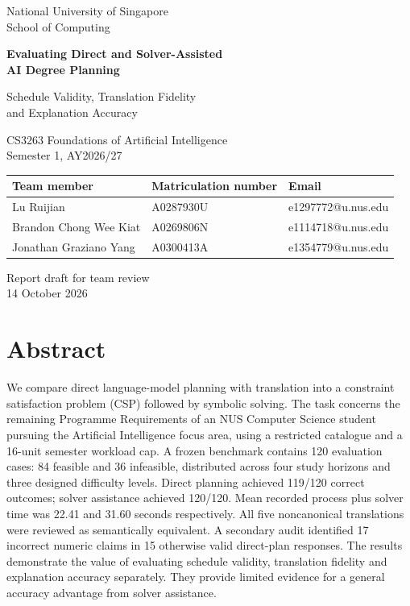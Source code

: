 \documentclass[11pt,a4paper]{article}
\renewenvironment{abstract}
  {\section*{Abstract}\begingroup\normalsize}
  {\endgroup}
\begin{document}
\hypersetup{pageanchor=false}
\begin{titlepage}
\centering
\vspace*{1.2cm}
{\Large National University of Singapore\\School of Computing\par}
\vspace{1.5cm}
{\LARGE\bfseries Evaluating Direct and Solver-Assisted\\[0.25em]
AI Degree Planning\par}
\vspace{0.7cm}
{\Large Schedule Validity, Translation Fidelity\\
and Explanation Accuracy\par}
\vspace{1.2cm}
{\large CS3263 Foundations of Artificial Intelligence\\
Semester 1, AY2026/27\par}
\vspace{1.3cm}
\begin{tabular}{lll}
\toprule
Team member & Matriculation number & Email\\
\midrule
Lu Ruijian & A0287930U & e1297772@u.nus.edu\\
Brandon Chong Wee Kiat & A0269806N & e1114718@u.nus.edu\\
Jonathan Graziano Yang & A0300413A & e1354779@u.nus.edu\\
\bottomrule
\end{tabular}
\vfill
{\large Report draft for team review\\14 October 2026\par}
\end{titlepage}
\hypersetup{pageanchor=true}

\begin{abstract}
We compare direct language-model planning with translation into a constraint
satisfaction problem (CSP) followed by symbolic solving. The task concerns the
remaining Programme Requirements of an NUS Computer Science student pursuing
the Artificial Intelligence focus area, using a restricted catalogue and a
16-unit semester workload cap. A frozen benchmark contains 120 evaluation
cases: 84 feasible and 36 infeasible, distributed across four study horizons
and three designed difficulty levels. Direct planning achieved 119/120 correct
outcomes; solver assistance achieved 120/120. Mean recorded process plus
solver time was 22.41 and 31.60 seconds respectively. All five noncanonical
translations were reviewed as semantically equivalent. A secondary audit
identified 17 incorrect numeric claims in 15 otherwise valid direct-plan
responses. The results demonstrate the value of evaluating schedule validity,
translation fidelity and explanation accuracy separately. They provide
limited evidence for a general accuracy advantage from solver assistance.
\end{abstract}
\end{document}
